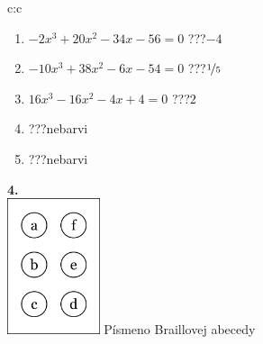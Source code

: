 \documentclass[10pt]{report}
\begin{document}
\begin{tabular}{c:c}
\begin{minipage}[c][104.5mm][t]{0.5\linewidth}
\begin{center}
\begin{minipage}{0.79\linewidth}
\begin{center}
\begin{varwidth}{\linewidth}
\begin{enumerate}
\item $-2x^3+20x^2-34x-56=0$\quad \dotfill\; ???\;\dotfill \quad $-4$
\item $-10x^3+38x^2-6x-54=0$\quad \dotfill\; ???\;\dotfill \quad $\nicefrac{1}{5}$
\item $16x^3-16x^2-4x+4=0$\quad \dotfill\; ???\;\dotfill \quad $2$
\item \quad \dotfill\; ???\;\dotfill \quad nebarvi
\item \quad \dotfill\; ???\;\dotfill \quad nebarvi
\end{enumerate}
\end{varwidth}
\end{center}
\end{minipage}
\begin{minipage}{0.20\linewidth}
\begin{center}
{\Huge\bfseries 4.} \\[2mm]
\includegraphics[height=40mm]{../images/braille.png}
{\small Písmeno Braillovej abecedy}
\end{center}
\end{minipage}
\end{center}
\end{minipage}
%
\end{tabular}
\newpage
\thispagestyle{empty}
\end{document}
